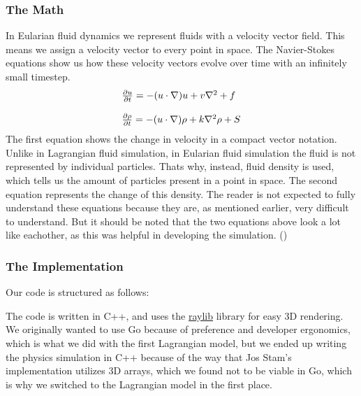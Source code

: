 \documentclass[a4paper,12pt]{article}
\begin{document}
\subsubsection{The Math}
In Eularian fluid dynamics we represent fluids with a velocity vector field. This means we assign a velocity vector to every point in space.
The Navier-Stokes equations show us how these velocity vectors evolve over time with an infinitely small timestep.
\[
\begin{array}{ll}
	\pdv{u}{t} = -(u \cdot \nabla)u + v\nabla^2 + f \\
  \\
  \pdv{\rho}{t} = -(u \cdot \nabla)\rho + k\nabla^2\rho + S
\end{array}
\]
The first equation shows the change in velocity in a compact vector notation. 
Unlike in Lagrangian fluid simulation, in Eularian fluid simulation the fluid is not represented by individual particles. 
Thats why, instead, fluid density is used, which tells us the amount of particles present in a point in space. 
The second equation represents the change of this density. 
The reader is not expected to fully understand these equations because they are, as mentioned earlier,
very difficult to understand. But it should be noted that the two equations above look a lot like eachother,
as this was helpful in developing the simulation. (\cite{josstam})

\subsubsection{The Implementation}
Our code is structured as follows:

The code is written in C++, and uses the \hyperlink{https://www.raylib.com/}{raylib}
library for easy 3D rendering.
We originally wanted to use Go because of preference and developer ergonomics,
which is what we did with the first Lagrangian model, but we ended up writing
the physics simulation in C++ because of the way that Jos Stam's implementation
utilizes 3D arrays, which we found not to be viable in Go, which is why we
switched to the Lagrangian model in the first place.
\end{document}
